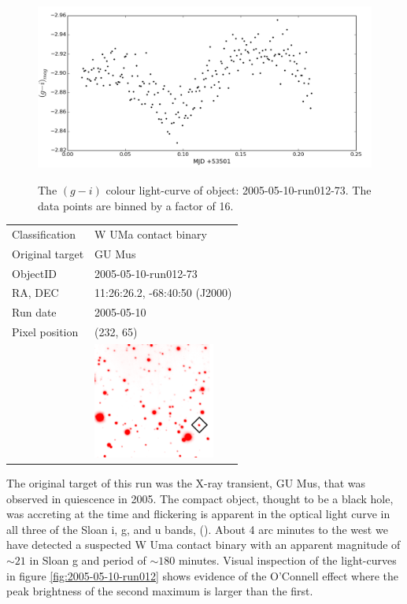   \begin{figure}
    \center
    \includegraphics[width=120mm]{images/2005-05-10-run012-colourcurve-bin16.png} 
    \label{fig:2005-05-10-run012-colour}
    \caption{The $(g - i)$ colour light-curve of object: 2005-05-10-run012-73. The data points are binned by a factor of 16. }
  \end{figure}
  

  \begin{tabular}{l l}
  Classification & {W UMa} contact binary \\
  Original target & GU Mus \\
  ObjectID & 2005-05-10-run012-73 \\
  RA, DEC & 11:26:26.2, -68:40:50 (J2000) \\
  Run date & 2005-05-10 \\
  Pixel position & (232, 65) \\
   & \includegraphics[width=40mm]{images/2005-05-10-run012-73.png} \\
  \end{tabular}
  
The original target of this run was the X-ray transient, {GU Mus}, that was observed in quiescence in 2005. The compact object, thought to be a black hole, was accreting at the time and flickering is apparent in the optical light curve in all three of the Sloan i, g, and u bands, (\cite{tariq2010}). About 4 arc minutes to the west we have detected a suspected {W Uma} contact binary with an apparent magnitude of $\sim21$ in Sloan g and period of $\sim 180$ minutes. Visual inspection of the light-curves in figure \ref{fig:2005-05-10-run012} shows evidence of the O'Connell effect where the peak brightness of the second maximum is larger than the first. 

